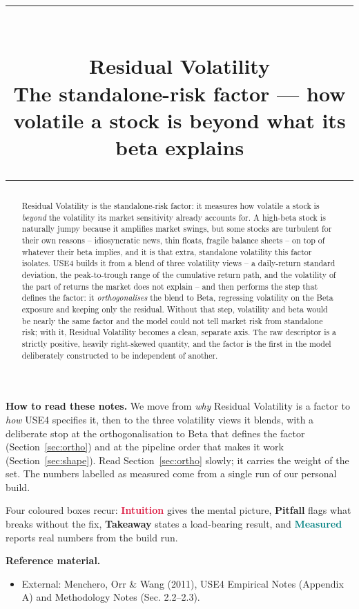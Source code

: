 \documentclass[11pt]{article}
\title{\vspace{-2.2em}
  {\color{steel}\rule{\textwidth}{1.3pt}}\\[0.7em]
  \Huge\bfseries Residual Volatility\\[0.35em]
  \large\mdseries The standalone-risk factor --- how volatile a stock is beyond what its beta explains\\[0.4em]
  {\color{steel}\rule{\textwidth}{0.7pt}}}
\author{}
\date{}
\theoremstyle{definition}
\theoremstyle{plain}
\theoremstyle{remark}
\begin{document}
\maketitle
\thispagestyle{empty}

\begin{abstract}
Residual Volatility is the standalone-risk factor: it measures how volatile a stock is \emph{beyond} the volatility its market sensitivity already accounts for. A high-beta stock is naturally jumpy because it amplifies market swings, but some stocks are turbulent for their own reasons -- idiosyncratic news, thin floats, fragile balance sheets -- on top of whatever their beta implies, and it is that extra, standalone volatility this factor isolates. USE4 builds it from a blend of three volatility views -- a daily-return standard deviation, the peak-to-trough range of the cumulative return path, and the volatility of the part of returns the market does not explain -- and then performs the step that defines the factor: it \emph{orthogonalises} the blend to Beta, regressing volatility on the Beta exposure and keeping only the residual. Without that step, volatility and beta would be nearly the same factor and the model could not tell market risk from standalone risk; with it, Residual Volatility becomes a clean, separate axis. The raw descriptor is a strictly positive, heavily right-skewed quantity, and the factor is the first in the model deliberately constructed to be independent of another.
\end{abstract}

\begin{tcolorbox}[colback=paperlt,colframe=ink!30,boxrule=0.4pt,arc=2pt,left=10pt,right=10pt,top=8pt,bottom=8pt]
\textbf{How to read these notes.} We move from \emph{why} Residual Volatility is a factor to \emph{how} USE4 specifies it, then to the three volatility views it blends, with a deliberate stop at the orthogonalisation to Beta that defines the factor (Section~\ref{sec:ortho}) and at the pipeline order that makes it work (Section~\ref{sec:shape}). Read Section~\ref{sec:ortho} slowly; it carries the weight of the set. The numbers labelled as measured come from a single run of our personal build.

\smallskip
Four coloured boxes recur: \textcolor{crimson}{\textbf{Intuition}} gives the mental picture, \textcolor{amber}{\textbf{Pitfall}} flags what breaks without the fix, \textcolor{steel}{\textbf{Takeaway}} states a load-bearing result, and \textcolor{teal}{\textbf{Measured}} reports real numbers from the build run.

\smallskip
\textbf{Reference material.}
\begin{itemize}[leftmargin=1.4em,topsep=2pt]
  \item External: Menchero, Orr \& Wang (2011), USE4 Empirical Notes (Appendix A) and Methodology Notes (Sec. 2.2--2.3).
\end{itemize}
\end{tcolorbox}
\end{document}
